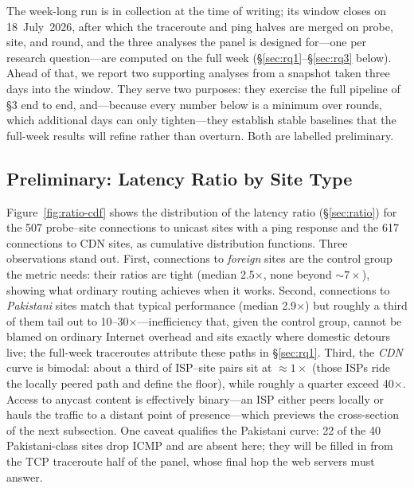 The week-long run is in collection at the time of writing; its window closes on 18~July~2026,
after which the traceroute and ping halves are merged on probe, site, and round, and the three
analyses the panel is designed for---one per research question---are computed on the full week
(\S\ref{sec:rq1}--\S\ref{sec:rq3} below). Ahead of that, we report two supporting analyses from a
snapshot taken three days into the window. They serve two purposes: they exercise the full
pipeline of \S3 end to end, and---because every number below is a minimum over rounds, which
additional days can only tighten---they establish stable baselines that the full-week results will
refine rather than overturn. Both are labelled preliminary.

\subsection{Preliminary: Latency Ratio by Site Type}
\label{sec:prelim-ratio}
Figure~\ref{fig:ratio-cdf} shows the distribution of the latency ratio (\S\ref{sec:ratio}) for the
507 probe--site connections to unicast sites with a ping response and the 617 connections to CDN
sites, as cumulative distribution functions. Three observations stand out. First, connections to
\emph{foreign} sites are the control group the metric needs: their ratios are tight (median
2.5$\times$, none beyond ${\sim}7\times$), showing what ordinary routing achieves when it works.
Second, connections to \emph{Pakistani} sites match that typical performance (median 2.9$\times$)
but roughly a third of them tail out to 10--30$\times$---inefficiency that, given the control
group, cannot be blamed on ordinary Internet overhead and sits exactly where domestic detours
live; the full-week traceroutes attribute these paths in \S\ref{sec:rq1}. Third, the \emph{CDN}
curve is bimodal: about a third of ISP--site pairs sit at ${\approx}1\times$ (those ISPs ride the
locally peered path and define the floor), while roughly a quarter exceed 40$\times$. Access to
anycast content is effectively binary---an ISP either peers locally or hauls the traffic to a
distant point of presence---which previews the cross-section of the next subsection. One caveat
qualifies the Pakistani curve: 22 of the 40 Pakistani-class sites drop ICMP and are absent here;
they will be filled in from the TCP traceroute half of the panel, whose final hop the web servers
must answer.

